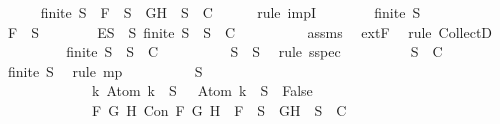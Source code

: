 \begin{isabellebody}
\ \ \ \ \isamarkupfalse%
\ {\isachardoublequoteopen}finite\ S{\isacharprime}\ {\isasymlongrightarrow}\ F\ {\isasymin}\ S{\isacharprime}\ {\isasymlongrightarrow}\ {\isacharbraceleft}G{\isacharcomma}H{\isacharbraceright}\ {\isasymunion}\ S{\isacharprime}\ {\isasymin}\ C{\isachardoublequoteclose}\isanewline
\ \ \ \ \isamarkupfalse%
\ {\isacharparenleft}rule\ impI{\isacharparenright}{\isacharplus}\isanewline
\ \ \ \ \ \ \isamarkupfalse%
\ {\isachardoublequoteopen}finite\ S{\isacharprime}{\isachardoublequoteclose}\isanewline
\ \ \ \ \ \ \isamarkupfalse%
\ {\isachardoublequoteopen}F\ {\isasymin}\ S{\isacharprime}{\isachardoublequoteclose}\isanewline
\ \ \ \ \ \ \isamarkupfalse%
\ E{\isacharcolon}{\isachardoublequoteopen}{\isasymforall}S{\isacharprime}\ {\isasymsubseteq}\ S{\isachardot}\ finite\ S{\isacharprime}\ {\isasymlongrightarrow}\ S{\isacharprime}\ {\isasymin}\ C{\isachardoublequoteclose}\isanewline
\ \ \ \ \ \ \ \ \isamarkupfalse%
\ assms{\isacharparenleft}{}{\isacharparenright}\ \isamarkupfalse%
\ extF\ \isamarkupfalse%
\ {\isacharparenleft}rule\ CollectD{\isacharparenright}\isanewline
\ \ \ \ \ \ \isamarkupfalse%
\ \isamarkupfalse%
\ {\isachardoublequoteopen}finite\ S{\isacharprime}\ {\isasymlongrightarrow}\ S{\isacharprime}\ {\isasymin}\ C{\isachardoublequoteclose}\isanewline
\ \ \ \ \ \ \ \ \isamarkupfalse%
\ {\isacartoucheopen}S{\isacharprime}\ {\isasymsubseteq}\ S{\isacartoucheclose}\ \isamarkupfalse%
\ {\isacharparenleft}rule\ sspec{\isacharparenright}\isanewline
\ \ \ \ \ \ \isamarkupfalse%
\ \isamarkupfalse%
\ {\isachardoublequoteopen}S{\isacharprime}\ {\isasymin}\ C{\isachardoublequoteclose}\isanewline
\ \ \ \ \ \ \ \ \isamarkupfalse%
\ {\isacartoucheopen}finite\ S{\isacharprime}{\isacartoucheclose}\ \isamarkupfalse%
\ {\isacharparenleft}rule\ mp{\isacharparenright}\isanewline
\ \ \ \ \ \ \isamarkupfalse%
\ {\isachardoublequoteopen}{\isasymbottom}\ {\isasymnotin}\ S{\isacharprime}\isanewline
\ \ \ \ \ \ \ \ \ \ \ \ {\isasymand}\ {\isacharparenleft}{\isasymforall}k{\isachardot}\ Atom\ k\ {\isasymin}\ S{\isacharprime}\ {\isasymlongrightarrow}\ \isactrlbold {\isasymnot}\ {\isacharparenleft}Atom\ k{\isacharparenright}\ {\isasymin}\ S{\isacharprime}\ {\isasymlongrightarrow}\ False{\isacharparenright}\isanewline
\ \ \ \ \ \ \ \ \ \ \ \ {\isasymand}\ {\isacharparenleft}{\isasymforall}F\ G\ H{\isachardot}\ Con\ F\ G\ H\ {\isasymlongrightarrow}\ F\ {\isasymin}\ S{\isacharprime}\ {\isasymlongrightarrow}\ {\isacharbraceleft}G{\isacharcomma}H{\isacharbraceright}\ {\isasymunion}\ S{\isacharprime}\ {\isasymin}\ C{\isacharparenright}\isanewline

\end{isabellebody}
